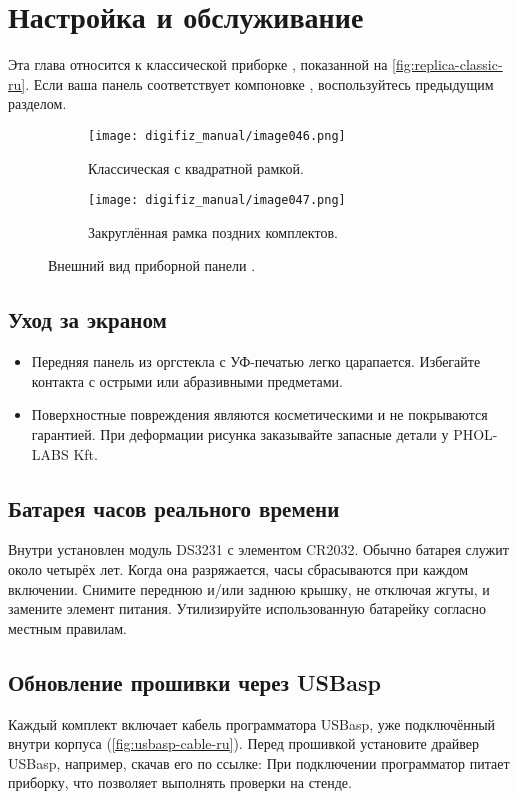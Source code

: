 \chapter{Настройка и обслуживание \ReplicaGenOne{}}\label{ch:replica-setup-ru}

Эта глава относится к классической приборке \ReplicaGenOne{}, показанной на \autoref{fig:replica-classic-ru}. Если ваша панель соответствует компоновке \ReplicaNextLong{}, воспользуйтесь предыдущим разделом.

\begin{figure}[htbp]
    \centering
    \begin{subfigure}{0.46\textwidth}
        \texttt{[image: digifiz\_manual/image046.png]}
        \caption{Классическая \ReplicaGenOne{} с квадратной рамкой.}
    \end{subfigure}\hfill
    \begin{subfigure}{0.46\textwidth}
        \texttt{[image: digifiz\_manual/image047.png]}
        \caption{Закруглённая рамка поздних комплектов.}
    \end{subfigure}
    \caption{Внешний вид приборной панели \ReplicaGenOne{}.}
    \label{fig:replica-classic-ru}
\end{figure}

\section{Уход за экраном}
\begin{itemize}
    \item Передняя панель из оргстекла с УФ-печатью легко царапается. Избегайте контакта с острыми или абразивными предметами.
    \item Поверхностные повреждения являются косметическими и не покрываются гарантией. При деформации рисунка заказывайте запасные детали у PHOL-LABS Kft.
\end{itemize}

\section{Батарея часов реального времени}
Внутри установлен модуль DS3231 с элементом CR2032. Обычно батарея служит около четырёх лет.
Когда она разряжается, часы сбрасываются при каждом включении.
Снимите переднюю и/или заднюю крышку, не отключая жгуты, и замените элемент питания. Утилизируйте использованную батарейку согласно местным правилам.

\section{Обновление прошивки через USBasp}
Каждый комплект включает кабель программатора USBasp, уже подключённый внутри корпуса (\autoref{fig:usbasp-cable-ru}).
Перед прошивкой установите драйвер USBasp, например, скачав его по ссылке:
При подключении программатор питает приборку, что позволяет выполнять проверки на стенде.

